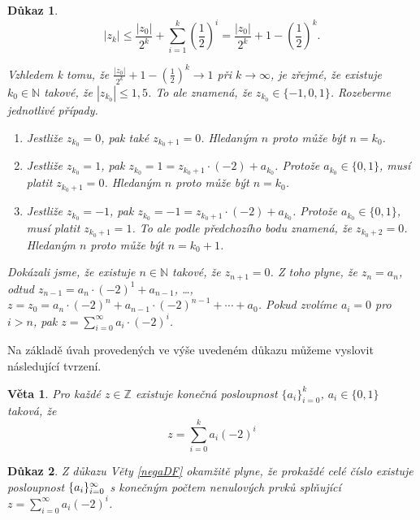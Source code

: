 \documentclass[12pt]{book}
\newtheorem{veta}{Věta}
\newtheorem*{dukaz}{Důkaz}
\begin{document}
\begin{dukaz}
\begin{equation}\label{NBe5}
|z_k| \leq \frac{|z_0|}{2^k}+\sum_{i=1}^{k}\left(\frac{1}{2}\right)^i = \frac{|z_0|}{2^k}+1-\left(\frac{1}{2}\right)^k.
\end{equation}

Vzhledem k tomu, že $\frac{|z_0|}{2^k}+1-\left(\frac{1}{2}\right)^k \to 1$ při $k \to \infty$, je zřejmé, že existuje $k_0 \in \mathbb{N}$ takové, že $|z_{k_0}| \leq 1,5$. To ale znamená, že $z_{k_0} \in \{-1, 0, 1\}$. Rozeberme jednotlivé případy.

\begin{enumerate}
			\item[a)] Jestliže $z_{k_0} = 0$, pak také $z_{k_0+1} = 0$. Hledaným $n$ proto může být $n = k_0$.
		  	\item[b)] Jestliže $z_{k_0} = 1$, pak $z_{k_0} = 1 = z_{k_0+1}\cdot(-2)+a_{k_0}$. Protože $a_{k_0} \in \{0,1\}$,
                      musí platit $z_{k_0+1}=0$.  Hledaným $n$ proto může být $n = k_0$.
            \item[c)] Jestliže $z_{k_0} = -1$, pak $z_{k_0} = -1 = z_{k_0+1}\cdot(-2)+a_{k_0}$. Protože $a_{k_0} \in
                      \{0,1\}$, musí platit $z_{k_0+1}=1$. To ale podle předchozího bodu znamená, že $z_{k_0+2}=0$.  Hledaným $n$ proto může být $n = k_0 + 1$.
\end{enumerate}

Dokázali jsme, že existuje $n \in \mathbb{N}$ takové, že $z_{n+1} = 0$. Z toho plyne, že $z_n = a_n$, odtud $z_{n-1} = a_n\cdot(-2)^1 + a_{n-1}$, \dots, $z = z_0 = a_n\cdot(-2)^n + a_{n-1}\cdot(-2)^{n-1} + \cdots + a_0$. Pokud zvolíme $a_i = 0$ pro $i > n$, pak $z=\sum_{i=0}^{\infty}a_i\cdot(-2)^i$.



\end{dukaz}

Na základě úvah provedených ve výše uvedeném důkazu můžeme vyslovit následující tvrzení.

\begin{veta}\label{NBv2}
Pro každé $z \in \mathbb{Z}$ existuje konečná posloupnost $\{a_i\}_{i=0}^k$, $a_i \in \{0, 1\}$ taková, že
$$
z = \sum_{i=0}^{k}a_i(-2)^i
$$
\end{veta}

\begin{dukaz}
  Z důkazu Věty \ref{negaDF} okamžitě plyne, že prokaždé celé číslo existuje posloupnost $\{a_i\}_{i=0}^{\infty}$ s konečným počtem nenulových prvků splňující $z=\sum_{i=0}^{\infty}a_i(-2)^i$. 
  
  
  
\end{dukaz}
\end{document}
